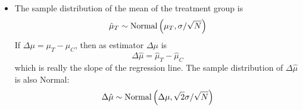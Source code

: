 \begin{itemize}
\item The sample distribution of the mean of the treatment group is
\begin{equation*}
\hat{\mu}_T \sim {\rm Normal}\left(\mu_T,\sigma/\sqrt{N}\right)
\end{equation*}
If  $\Delta \mu = \mu_T-\mu_C$, then as estimator $\Delta \mu$ is 
\begin{equation*}
\Delta \hat{\mu} =  \hat{\mu}_T-\hat{\mu}_C
\end{equation*}
which is really the slope of the regression line. 
The sample distribution of $\Delta \hat{\mu}$ is also Normal:
\begin{equation*}
\Delta \hat{\mu} \sim {\rm Normal}\left(\Delta \mu, \sqrt{2}\sigma/\sqrt{N}\right)
\end{equation*}





\end{itemize}




